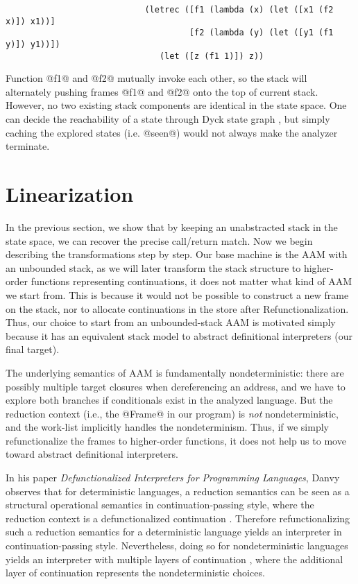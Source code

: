 \documentclass[acmsmall, review]{acmart}\settopmatter{}
\begin{document}
\begin{lstlisting}
                            (letrec ([f1 (lambda (x) (let ([x1 (f2 x)]) x1))]
                                     [f2 (lambda (y) (let ([y1 (f1 y)]) y1))])
                               (let ([z (f1 1)]) z))
\end{lstlisting}

Function @f1@ and @f2@ mutually invoke each other, so the stack will alternately pushing
frames @f1@ and @f2@ onto the top of current stack. However, no two existing stack
components are identical in the state space. One can decide the reachability of a state
through Dyck state graph \cite{earl2010pushdown, earl2012introspective}, but simply
caching the explored states (i.e. @seen@) would not always make the analyzer terminate.


\section{Linearization} \label{linear}

In the previous section, we show that by keeping an unabstracted stack in the state
space, we can recover the precise call/return match. Now we begin describing the
transformations step by step. Our base machine is the AAM with an unbounded
stack, as we will later transform the stack structure to higher-order functions
representing continuations, it does not matter what kind of AAM we start from.
This is because it would not be possible to construct a new frame on the stack, nor
to allocate continuations in the store after Refunctionalization.
Thus, our choice to start from an unbounded-stack AAM is motivated simply because
it has an equivalent stack model to abstract definitional interpreters (our final target).

The underlying semantics of AAM is fundamentally nondeterministic: there are possibly
multiple target closures when dereferencing an address, and we have to explore both branches
if conditionals exist in the analyzed language. But the reduction context (i.e., the @Frame@ in
our program) is \emph{not} nondeterministic, and the work-list implicitly
handles the nondeterminism. Thus, if we simply refunctionalize the frames to higher-order
functions, it does not help us to move toward abstract definitional interpreters.

In his paper \textit{Defunctionalized Interpreters for Programming Languages},
Danvy observes that for deterministic languages, a reduction semantics can be seen as 
a structural operational semantics in continuation-passing style, where the reduction context is
a defunctionalized continuation \cite{Danvy:2008:DIP:1411204.1411206}. Therefore
refunctionalizing such a reduction semantics for a deterministic language yields 
an interpreter in continuation-passing style. 
Nevertheless, doing so for nondeterministic languages yields an interpreter
with multiple layers of continuation \cite{Danvy:2006:RW:2171265.2171268, DANVY2009534},
where the additional layer of continuation represents the nondeterministic choices.
\end{document}
